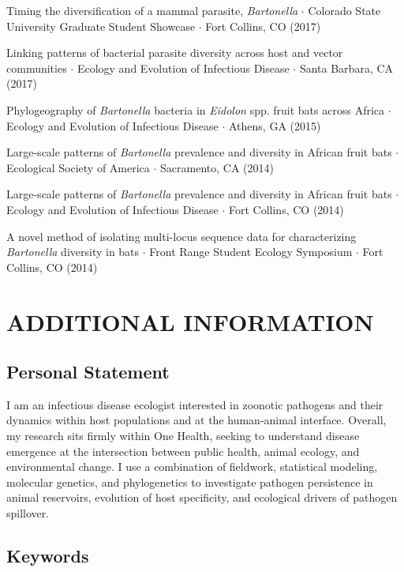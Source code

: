 \documentclass{cv}
\begin{document}
Timing the diversification of a mammal parasite, \textit{Bartonella} $\cdot$ Colorado State University Graduate Student Showcase $\cdot$ Fort Collins, CO (2017)

Linking patterns of bacterial parasite diversity across host and vector communities $\cdot$ Ecology and Evolution of Infectious Disease $\cdot$ Santa Barbara, CA (2017)

Phylogeography of \textit{Bartonella} bacteria in \textit{Eidolon} spp. fruit bats across Africa $\cdot$ Ecology and Evolution of Infectious Disease $\cdot$ Athens, GA (2015)

Large-scale patterns of \textit{Bartonella} prevalence and diversity in African fruit bats $\cdot$ Ecological Society of America $\cdot$ Sacramento, CA (2014)

Large-scale patterns of \textit{Bartonella} prevalence and diversity in African fruit bats $\cdot$ Ecology and Evolution of Infectious Disease $\cdot$ Fort Collins, CO (2014)

A novel method of isolating multi-locus sequence data for characterizing \textit{Bartonella} diversity in bats $\cdot$ Front Range Student Ecology Symposium $\cdot$ Fort Collins, CO (2014)


\section*{ADDITIONAL INFORMATION}

\subsection*{Personal Statement}

I am an infectious disease ecologist interested in zoonotic pathogens and their dynamics within host populations and at the human-animal interface. Overall, my research sits firmly within One Health, seeking to understand disease emergence at the intersection between public health, animal ecology, and environmental change. I use a combination of fieldwork, statistical modeling, molecular genetics, and phylogenetics to investigate pathogen persistence in animal reservoirs, evolution of host specificity, and ecological drivers of pathogen spillover.

\subsection*{Keywords}
\end{document}
